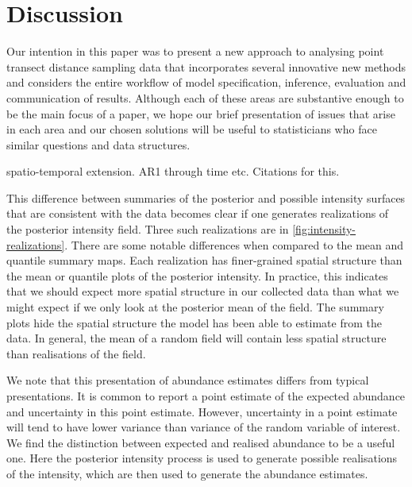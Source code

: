\documentclass[preprint,12pt]{elsarticle}
\begin{document}
\section{Discussion}

Our intention in this paper was to present a new approach to analysing point transect distance sampling data that incorporates several innovative new methods and considers the entire workflow of model specification, inference, evaluation and communication of results.  Although each of these areas are substantive enough to be the main focus of a paper, we hope our brief presentation of issues that arise in each area and our chosen solutions will be useful to statisticians who face similar questions and data structures.

spatio-temporal extension. AR1 through time etc.  Citations for this.


This difference between summaries of the posterior and possible intensity surfaces that are consistent with the data becomes clear if one generates realizations of the posterior intensity field.  Three such realizations are in \autoref{fig:intensity-realizations}.  There are some notable differences when compared to the mean and quantile summary maps.  Each realization has finer-grained spatial structure than the mean or quantile plots of the posterior intensity.  In practice, this indicates that we should expect more spatial structure in our collected data than what we might expect if we only look at the posterior mean of the field.  The summary plots hide the spatial structure the model has been able to estimate from the data.  In general, the mean of a random field will contain less spatial structure than realisations of the field.


We note that this presentation of abundance estimates differs from typical presentations.  It is common to report a point estimate of the expected abundance and uncertainty in this point estimate.  However, uncertainty in a point estimate will tend to have lower variance than variance of the random variable of interest.  We find the distinction between expected and realised abundance to be a useful one. Here the posterior intensity process is used to generate possible realisations of the intensity, which are then used to generate the abundance estimates. 

\clearpage


\end{document}
